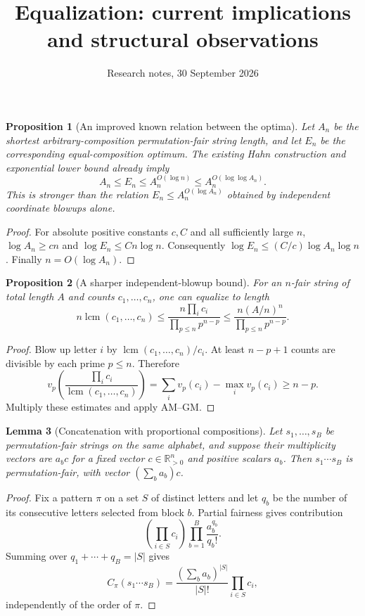 \documentclass[11pt]{article}
\title{Equalization: current implications and structural observations}
\author{Research notes, 30 September 2026}
\date{}
\newtheorem{proposition}{Proposition}
\newtheorem{lemma}[proposition]{Lemma}
\begin{document}
\maketitle

\begin{proposition}[An improved known relation between the optima]
Let $A_n$ be the shortest arbitrary-composition permutation-fair string
length, and let $E_n$ be the corresponding equal-composition optimum.
The existing Hahn construction and exponential lower bound already imply
\[
 A_n\le E_n\le A_n^{O(\log n)}
                 \le A_n^{O(\log\log A_n)}.
\]
This is stronger than the relation $E_n\le A_n^{O(\log A_n)}$
obtained by independent coordinate blowups alone.
\end{proposition}
\begin{proof}
For absolute positive constants $c,C$ and all sufficiently large $n$,
$\log A_n\ge cn$ and $\log E_n\le Cn\log n$. Consequently
$\log E_n\le(C/c)\log A_n\log n$. Finally $n=O(\log A_n)$.
\end{proof}

\begin{proposition}[A sharper independent-blowup bound]
For an $n$-fair string of total length $A$ and counts $c_1,\ldots,c_n$,
one can equalize to length
\[
 n\operatorname{lcm}(c_1,\ldots,c_n)
 \le\frac{n\prod_i c_i}{\prod_{p\le n}p^{n-p}}
 \le\frac{n(A/n)^n}{\prod_{p\le n}p^{n-p}}.
\]
\end{proposition}
\begin{proof}
Blow up letter $i$ by $\operatorname{lcm}(c_1,\ldots,c_n)/c_i$.
At least $n-p+1$ counts are divisible by each prime $p\le n$.
Therefore
\[
 v_p\left(\frac{\prod_i c_i}{\operatorname{lcm}(c_1,\ldots,c_n)}\right)
 =\sum_i v_p(c_i)-\max_i v_p(c_i)\ge n-p.
\]
Multiply these estimates and apply AM--GM.
\end{proof}

\begin{lemma}[Concatenation with proportional compositions]
Let $s_1,\ldots,s_B$ be permutation-fair strings on the same alphabet,
and suppose their multiplicity vectors are $a_b c$ for a fixed vector
$c\in\mathbb R_{>0}^n$ and positive scalars $a_b$.
Then $s_1\cdots s_B$ is permutation-fair, with vector
$(\sum_b a_b)c$.
\end{lemma}
\begin{proof}
Fix a pattern $\pi$ on a set $S$ of distinct letters and let $q_b$ be
the number of its consecutive letters selected from block $b$.
Partial fairness gives contribution
\[
 \left(\prod_{i\in S}c_i\right)
 \prod_{b=1}^B\frac{a_b^{q_b}}{q_b!}.
\]
Summing over $q_1+\cdots+q_B=|S|$ gives
\[
 C_\pi(s_1\cdots s_B)=
 \frac{(\sum_b a_b)^{|S|}}{|S|!}\prod_{i\in S}c_i,
\]
independently of the order of $\pi$.
\end{proof}
\end{document}
